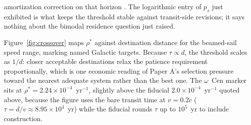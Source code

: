 \documentclass[11pt]{article}
\begin{document}
amortization correction on that horizon \citep{Swanson2026Engineered}. The logarithmic entry of $p_{s}$ just exhibited is what keeps the threshold stable against transit-side revisions; it says nothing about the bimodal residence question just raised.

Figure~\ref{fig:crossover} maps $\rho^{*}$ against destination distance for the beamed-sail speed range, marking named Galactic targets. Because $\tau \propto d$, the threshold scales as $1/d$: closer acceptable destinations relax the patience requirement proportionally, which is one economic reading of Paper A's selection pressure toward the nearest adequate system rather than the best one. The $\omega$~Cen marker sits at $\rho^{*} = 2.24\times10^{-4}$~yr$^{-1}$, slightly above the fiducial $2.0\times10^{-4}$~yr$^{-1}$ quoted above, because the figure uses the bare transit time at $v = 0.2c$ ($\tau = d/v \approx 8.95\times10^{4}$~yr) while the fiducial rounds $\tau$ up to $10^{5}$~yr to include construction.
\end{document}
